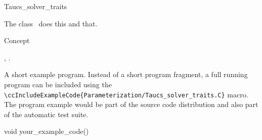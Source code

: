 

\begin{ccRefClass}{Taucs_solver_traits}  %


\ccDefinition
  
The class \ccRefName\ does this and that.


\ccIsModel

Concept

\ccTypes


\ccCreation
{}  %


\ccOperations


\ccSeeAlso

,
.

\ccExample

A short example program.
Instead of a short program fragment, a full running program can be
included using the 
\verb|\ccIncludeExampleCode{Parameterization/Taucs_solver_traits.C}| 
macro. The program example would be part of the source code distribution and
also part of the automatic test suite.

\begin{ccExampleCode}
void your_example_code() {
}
\end{ccExampleCode}


\end{ccRefClass}



